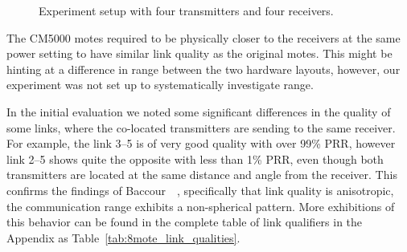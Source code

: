\begin{figure}[t]
	\centering
	\caption{Experiment setup with four transmitters and four receivers.}
	\label{fig:8mote_experiment_setup}
\end{figure}

The CM5000 motes required to be physically closer to the receivers at the same power setting to have similar link quality as the original motes.
This might be hinting at a difference in range between the two hardware layouts, however, our experiment was not set up to systematically investigate range.

In the initial evaluation we noted some significant differences in the quality of some links, where the co-located transmitters are sending to the same receiver.
For example, the link 3--5 is of very good quality with over 99\% \ac{PRR}, however link 2--5 shows quite the opposite with less than 1\% \ac{PRR}, even though both transmitters are located at the same distance and angle from the receiver.
This confirms the findings of Baccour~\etal~\cite{Baccour2012}, specifically that link quality is anisotropic, \ie the communication range exhibits a non-spherical pattern.
More exhibitions of this behavior can be found in the complete table of link qualifiers in the Appendix as Table~\ref{tab:8mote_link_qualities}.

